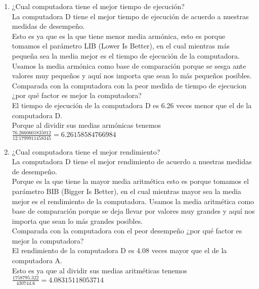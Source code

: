 \documentclass{article}
\begin{document}
    \begin{enumerate}
        \item {
        ¿Cual computadora tiene el mejor tiempo de ejecución?\\
         La computadora D tiene el mejor tiempo de ejecución de acuerdo a nuestras medidas de desempeño.\\
         
         Esto es ya que es la que tiene menor media armónica, esto es porque tomamos el parámetro LIB (Lower Is Better), en el cual mientras más pequeña sea la media mejor es el tiempo de ejecución de la computadora. Usamos la media armónica como base de comparación porque se sesga ante valores muy pequeños y aquí nos importa que sean lo más pequeños posibles.\\
      
        Comparada con la computadora con la peor medida de tiempo de ejecucion ¿por qué factor es mejor la computadora?\\
         El tiempo de ejecución de la computadora D es 6.26 veces menor que el de la computadora D.\\
         
          Porque al dividir sus medias armónicas tenemos $\frac{76.2660601835012}{12.1799911458345} = 6.26158584766984$\\
        }
        
        \item {
        ¿Cual computadora tiene el mejor rendimiento?\\
         La computadora D tiene el mejor rendimiento de acuerdo a nuestras medidas de desempeño.\\
          
         Porque es la que tiene la mayor media aritmética esto es porque tomamos el parámetro BIB (Bigger Is Better), en el cual mientras mayor sea la media mejor es el rendimiento de la computadora. Usamos la media aritmética como base de comparación porque se deja llevar por valores muy grandes y aquí nos importa que sean lo más grandes posibles.\\
        
        Comparada con la computadora con el peor desempeño ¿por qué factor es mejor la computadora?\\
        El rendimiento de la computadora D es 4.08 veces mayor que el de la computadora A.\\
        
        Esto es ya que al dividir sus medias aritméticas tenemos $\frac{1758795.322}{430744.6} = 4.08315118053714$\\
               
}
\end{enumerate}
\end{document}
